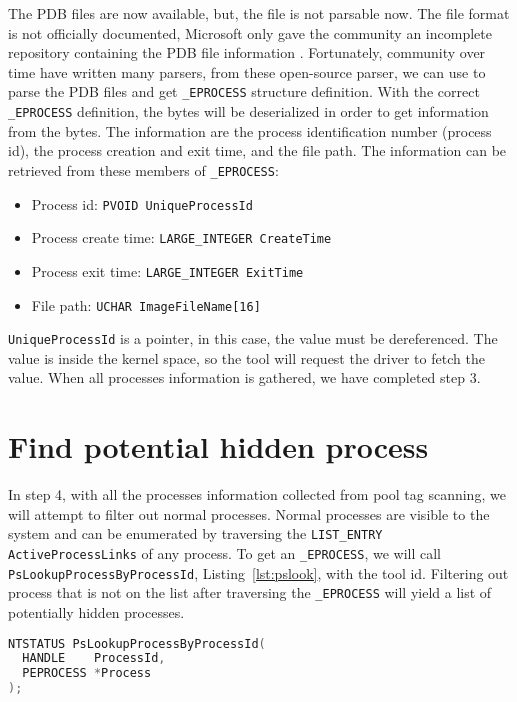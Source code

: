 The PDB files are now available, but, the file is not parsable now. The file format is not officially documented, Microsoft only gave the community an incomplete repository containing the PDB file information \cite{microsoft-pdb}. Fortunately, community over time have written many parsers, from these open-source parser, we can use to parse the PDB files and get \texttt{\_EPROCESS} structure definition. With the correct \texttt{\_EPROCESS} definition, the bytes will be deserialized in order to get information from the bytes. The information are the process identification number (process id), the process creation and exit time, and the file path. The information can be retrieved from these members of \texttt{\_EPROCESS}:

\begin{itemize}
  \item Process id: \texttt{PVOID UniqueProcessId}
  \item Process create time: \texttt{LARGE\_INTEGER CreateTime}
  \item Process exit time: \texttt{LARGE\_INTEGER ExitTime}
  \item File path: \texttt{UCHAR ImageFileName[16]}
\end{itemize}

\texttt{UniqueProcessId} is a pointer, in this case, the value must be dereferenced. The value is inside the kernel space, so the tool will request the driver to fetch the value. When all processes information is gathered, we have completed step 3.

\section[Find potential hidden process]{Find potential hidden process}

In step 4, with all the processes information collected from pool tag scanning, we will attempt to filter out normal processes. Normal processes are visible to the system and can be enumerated by traversing the \texttt{LIST\_ENTRY ActiveProcessLinks} of any process. To get an \texttt{\_EPROCESS}, we will call \texttt{PsLookupProcessByProcessId}, Listing~\ref{lst:pslook}, with the tool id. Filtering out process that is not on the list after traversing the \texttt{\_EPROCESS} will yield a list of potentially hidden processes.

\begin{lstlisting}[language=cpp,caption={PsLookupProcessByProcessId},label={lst:pslook}]
NTSTATUS PsLookupProcessByProcessId(
  HANDLE    ProcessId,
  PEPROCESS *Process
);
\end{lstlisting}

